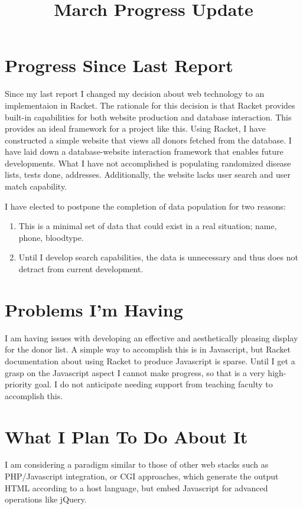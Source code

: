 \documentclass[11pt]{article}
\title{March Progress Update}
\begin{document}
\date{}
\maketitle
\section{Progress Since Last Report}
\label{sec-1}
Since my last report I changed my decision about web technology to an
implementaion in Racket. The rationale for this decision is that
Racket provides built-in capabilities for both website production and
database interaction. This provides an ideal framework for a project
like this. Using Racket, I have constructed a simple website that views all donors
fetched from the database. I have laid down a database-website
interaction framework that enables future developments. What I have
not accomplished is populating randomized disease lists, tests done,
addresses. Additionally, the website lacks user search and user match
capability.

I have elected to postpone the completion of data population for two reasons: 
\begin{enumerate}
\item This is a minimal set of data that could exist in a real
situation; name, phone, bloodtype.
\item Until I develop search capabilities, the data is unnecessary and
thus does not detract from current development.
\end{enumerate}
\section{Problems I'm Having}
\label{sec-2}
I am having issues with developing an effective and aesthetically
pleasing display for the donor list. A simple way to accomplish this
is in Javascript, but Racket documentation about using Racket to
produce Javascript is sparse. Until I get a grasp on the Javascript
aspect I cannot make progress, so that is a very high-priority goal. I
do not anticipate needing support from teaching faculty to accomplish this.
\section{What I Plan To Do About It}
\label{sec-3}
I am considering a paradigm similar to those of other web stacks such
as PHP/Javascript integration, or CGI approaches, which generate the
output HTML according to a host language, but embed Javascript for
advanced operations like jQuery.
\end{document}
